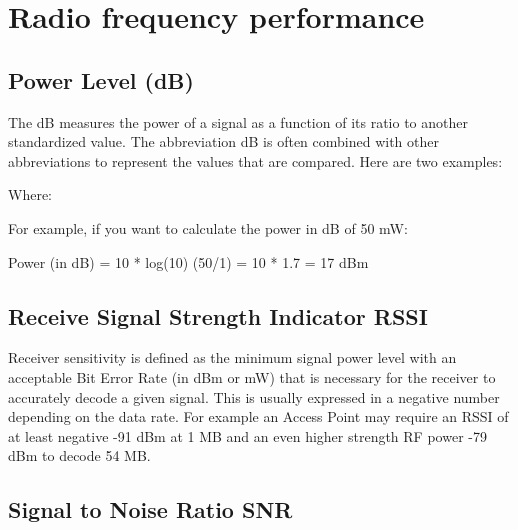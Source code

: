\section{Radio frequency performance}

\subsection{Power Level (dB)}

The dB measures the power of a signal as a function of its ratio to another standardized value. The
abbreviation dB is often combined with other abbreviations to represent the values that are compared.
Here are two examples:


Where:

For example, if you want to calculate the power in dB of 50 mW:

Power (in dB) = 10 * log(10) (50/1) = 10 * 1.7 = 17 dBm

\subsection{Receive Signal Strength Indicator RSSI}

Receiver sensitivity is defined as the minimum signal power level with an acceptable Bit Error Rate (in dBm or mW) that is necessary for the receiver to accurately decode a given signal.
This is usually expressed in a negative number depending on the data rate.
For example an Access Point may require an RSSI of at least negative -91 dBm at 1 MB and an even higher strength RF power -79 dBm to decode 54 MB.

\subsection{Signal to Noise Ratio SNR}


